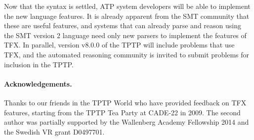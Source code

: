 Now that the syntax is settled, ATP system developers will be able to
implement the new language features.
It is already apparent from the SMT community that these are useful features,
and systems that can already parse and reason using the SMT version 2 language 
need only new parsers to implement the features of TFX.
In parallel, version v8.0.0 of the TPTP will include problems that use TFX,
and the automated reasoning community is invited to submit problems for
inclusion in the TPTP.

\paragraph{Acknowledgements.}
Thanks to our friends in the TPTP World who have provided feedback on TFX
features, starting from the TPTP Tea Party at CADE-22 in 2009. The second
author was partially supported by the Wallenberg Academy Fellowship 2014 and
the Swedish VR grant D0497701.